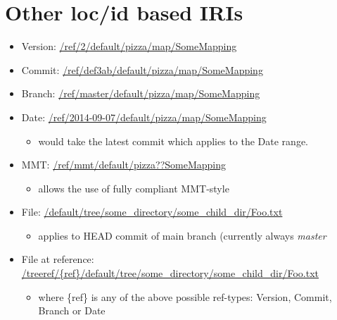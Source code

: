 \documentclass[a4paper,11pt,DIV=25]{scrartcl}
\begin{document}
\section{Other loc/id based IRIs}

\begin{itemize}
  \item Version: \url{/ref/2/default/pizza/map/SomeMapping}
  \item Commit: \url{/ref/def3ab/default/pizza/map/SomeMapping}
  \item Branch: \url{/ref/master/default/pizza/map/SomeMapping}
  \item Date: \url{/ref/2014-09-07/default/pizza/map/SomeMapping}
    \begin{itemize}
      \item would take the latest commit which applies to the Date range.
    \end{itemize}
  \item MMT: \url{/ref/mmt/default/pizza??SomeMapping}
    \begin{itemize}
      \item allows the use of fully compliant MMT-style
    \end{itemize}
  \item File: \url{/default/tree/some_directory/some_child_dir/Foo.txt}
    \begin{itemize}
      \item applies to HEAD commit of main branch (currently always \textit{master}
    \end{itemize}
  \item File at reference: \url{/treeref/\{ref\}/default/tree/some_directory/some_child_dir/Foo.txt}
    \begin{itemize}
      \item where \{ref\} is any of the above possible ref-types: Version, Commit, Branch or Date
    \end{itemize}
\end{itemize}
\end{document}
